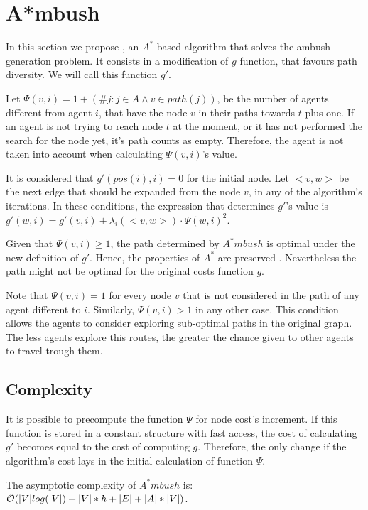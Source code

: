 \section{A*mbush}

In this section we propose \ambush, an $A^*$-based
algorithm that solves the ambush generation problem. 
It consists in a modification of $g$ function, that favours
path diversity. We will call this function $g'$.

Let $\Psi(v,i) = 1+(\# j : j \in A \wedge v \in path(j))$,
be the number of agents different from agent $i$, that have the 
node $v$ in their paths towards $t$ plus one. If an agent is not trying to 
reach node $t$ at the moment, or it has not performed the 
search for the node yet, it's path counts as empty. 
Therefore, the agent is not taken into account when calculating
$\Psi(v,i)$'s value. 

It is considered that $g'(pos(i),i) = 0$ for the initial node.
 Let $<v,w>$ be the next edge that should be expanded
from the node $v$, in any of the algorithm's iterations. In
these conditions, the expression that determines $g'$'s value
is $g'(w, i) = g'(v,i) + \lambda_i(<v,w>) \cdot \Psi(w,i)^2$.

Given that $\Psi(v,i) \geq 1$, the path determined by $A^*mbush$
is optimal under the new definition of $g'$. Hence, the properties of
 $A^*$ are preserved \cite{art2}. Nevertheless the path might not 
 be optimal for the original costs function $g$.

Note that $\Psi(v,i) = 1$ for every node $v$ that is not considered
in the path of any agent different to $i$. Similarly,
$\Psi(v,i) > 1$ in any other case. This condition allows the 
agents to consider exploring sub-optimal paths in the 
original graph. The less agents explore this routes, the greater
the chance given to other agents to travel trough them.

\subsection{Complexity}

It is possible to precompute the
function $\Psi$ for node cost's increment. If this function is stored
in a constant structure with fast access, the cost of calculating
$g'$ becomes equal to the cost of computing $g$.
Therefore, the only change if the algorithm's cost
 lays in the initial calculation of function $\Psi$.

The asymptotic complexity of $A^*mbush$ is:
$\mathcal{O}(|V|log(|V|) + |V|*h + |E| + |A|*|V| )$.

